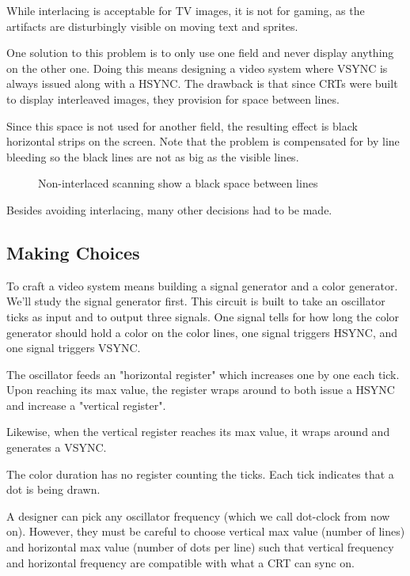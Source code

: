 While interlacing is acceptable for TV images, it is not for gaming, as the artifacts are disturbingly visible on moving text and sprites. 

One solution to this problem is to only use one field and never display anything on the other one. Doing this means designing a video system where VSYNC is always issued along with a HSYNC. The drawback is that since CRTs were built to display interleaved images, they provision for space between lines. 

Since this space is not used for another field, the resulting effect is black horizontal strips on the screen. Note that the problem is compensated for by line bleeding so the black lines are not as big as the visible lines.

\begin{figure}[H]
\caption*{Non-interlaced scanning show a black space between lines}
\end{figure}


Besides avoiding interlacing, many other decisions had to be made.





\subsection{Making Choices}

To craft a video system means building a signal generator and a color generator. We'll study the signal generator first. This circuit is built to take an oscillator ticks as input and to output three signals. One signal tells for how long the color generator should hold a color on the color lines, one signal triggers HSYNC, and one signal triggers VSYNC. 


The oscillator feeds an "horizontal register" which increases one by one each tick. Upon reaching its max value, the register wraps around to both issue a HSYNC and increase a "vertical register". 

Likewise, when the vertical register reaches its max value, it wraps around and generates a VSYNC. 

The color duration has no register counting the ticks. Each tick indicates that a dot is being drawn.

A designer can pick any oscillator frequency (which we call dot-clock from now on). However, they must be careful to choose vertical max value (number of lines) and horizontal max value (number of dots per line) such that vertical frequency and horizontal frequency are compatible with what a CRT can sync on. 

